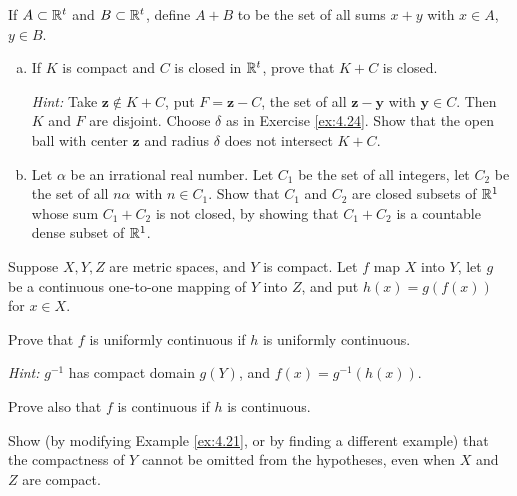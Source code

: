 \begin{myExercise}
    \label{ex:4.25}
    If $A \subset {\protect\mathbb R}^t$ and $B \subset {\protect\mathbb R}^t$, 
    define $A + B$ to be the set of all sums $x + y$ with $x \in A$, $y \in B$.
    \begin{enumerate}[(a)]
        \item If $K$ is compact and $C$ is closed in ${\protect\mathbb R}^t$, 
        prove that $K + C$ is closed.

        \emph{Hint:} Take $\mathbf{z} \not\in K + C$, put $F= \mathbf{z}- C$, the set of all $\mathbf{z- y}$ with $\mathbf{y} \in C$. 
        Then $K$ and $F$ are disjoint. 
        Choose $\delta$ as in Exercise \ref{ex:4.24}. 
        Show that the open ball with center $\mathbf{z}$ and radius $\delta$ does not intersect $K + C$.
        \item Let $\alpha$ be an irrational real number. 
        Let $C_1$ be the set of all integers, 
        let $C_2$ be the set of all $n\alpha$ with $n \in C_1$. 
        Show that $C_1$ and $C_2$ are closed subsets of ${\protect\mathbb R}^1$ whose
        sum $C_1 + C_2$ is not closed, by showing that $C_1 + C_2$ is a countable dense subset of ${\protect\mathbb R}^1$.
    \end{enumerate}
\end{myExercise}


\begin{myExercise}
    \label{ex:4.26}
    Suppose $X, Y, Z$ are metric spaces, and $Y$ is compact. 
    Let $f$ map $X$ into $Y$, 
    let $g$ be a continuous one-to-one mapping of $Y$ into $Z$, 
    and put $h(x) = g(f(x))$ for $x \in X$.

    Prove that $f$ is uniformly continuous if $h$ is uniformly continuous.
    
    \emph{Hint:} $g^{-1}$ has compact domain $g(Y)$, and $f(x) = g^{-1}(h(x))$. 
    
    Prove also that $f$ is continuous if $h$ is continuous. 

    Show (by modifying Example \ref{ex:4.21}, or by finding a different example) that the compactness of $Y$ cannot be omitted from the hypotheses, even when $X$ and $Z$ are compact.
\end{myExercise}